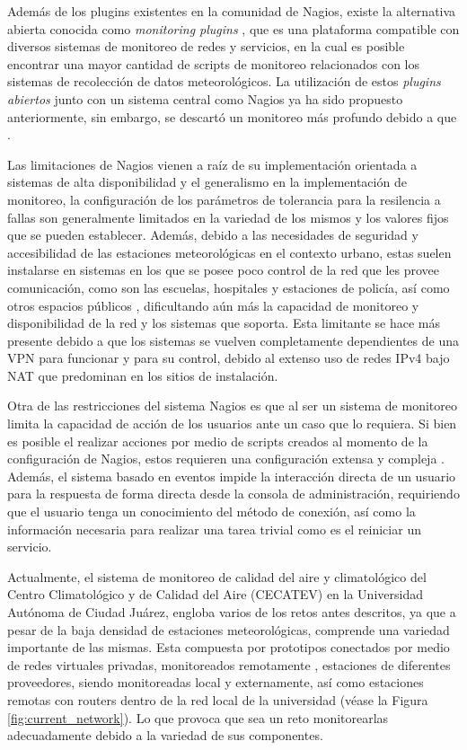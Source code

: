 Además de los plugins existentes en la comunidad de Nagios, existe la alternativa abierta conocida como \textit{monitoring plugins} \cite{monitoring_plugins}, que es una plataforma compatible con diversos sistemas de monitoreo de redes y servicios, en la cual es posible encontrar una mayor cantidad de scripts de monitoreo relacionados con los sistemas de recolección de datos meteorológicos. La utilización de estos \textit{plugins abiertos} junto con un sistema central como Nagios ya ha sido propuesto anteriormente, sin embargo, se descartó un monitoreo más profundo debido a que  \cite{monitoreo_raspberry_nagios}.

Las limitaciones de Nagios vienen a raíz de su implementación orientada a sistemas de alta disponibilidad y el generalismo en la implementación de monitoreo, la configuración de los parámetros de tolerancia para la resilencia a fallas son generalmente limitados en la variedad de los mismos y los valores fijos que se pueden establecer. Además, debido a las necesidades de seguridad y accesibilidad de las estaciones meteorológicas en el contexto urbano, estas suelen instalarse en sistemas en los que se posee poco control de la red que les provee comunicación, como son las escuelas, hospitales y estaciones de policía, así como otros espacios públicos \cite{muller_sensors_and_the_city}, dificultando aún más la capacidad de monitoreo y disponibilidad de la red y los sistemas que soporta. Esta limitante se hace más presente debido a que los sistemas se vuelven completamente dependientes de una VPN para funcionar y para su control, debido al extenso uso de redes IPv4 bajo NAT que predominan en los sitios de instalación.

Otra de las restricciones del sistema Nagios es que al ser un sistema de monitoreo limita la capacidad de acción de los usuarios ante un caso que lo requiera. Si bien es posible el realizar acciones por medio de scripts creados al momento de la configuración de Nagios, estos requieren una configuración extensa y compleja \cite{nagios_service_restart}. Además, el sistema basado en eventos impide la interacción directa de un usuario para la respuesta de forma directa desde la consola de administración, requiriendo que el usuario tenga un conocimiento del método de conexión, así como la información necesaria para realizar una tarea trivial como es el reiniciar un servicio.

Actualmente, el sistema de monitoreo de calidad del aire y climatológico del Centro Climatológico y de Calidad del Aire (CECATEV) en la Universidad Autónoma de Ciudad Juárez, engloba varios de los retos antes descritos, ya que a pesar de la baja densidad de estaciones meteorológicas, comprende una variedad importante de las mismas. Esta compuesta por prototipos conectados por medio de redes virtuales privadas, monitoreados remotamente \cite{red_climatologica_uacj}, estaciones de diferentes proveedores, siendo monitoreadas local y externamente, así como estaciones remotas con routers dentro de la red local de la universidad (véase la Figura \ref{fig:current_network}). Lo que provoca que sea un reto monitorearlas adecuadamente debido a la variedad de sus componentes.

